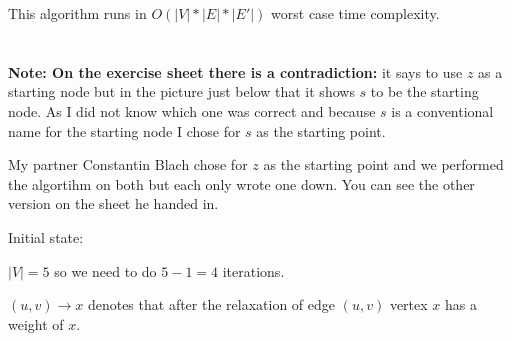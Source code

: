 \documentclass[12pt]{article}
\begin{document}
This algorithm runs in $O(|V| * |E| * |E'|)$ worst case time complexity.

\section{} %
\textbf{Note: On the exercise sheet there is a contradiction:} it says to use $z$ as a starting node but in the picture just below that it shows $s$ to be the starting node. As I did not know which one was correct and because $s$ is a conventional name for the starting node I chose for $s$ as the starting point.

My partner Constantin Blach chose for $z$ as the starting point and we performed the algortihm on both but each only wrote one down. You can see the other version on the sheet he handed in.

Initial state:


$|V| = 5$ so we need to do $5 - 1 = 4$ iterations.

$(u, v) \rightarrow x$ denotes that after the relaxation of edge $(u, v)$ vertex $x$ has a weight of $x$.
\end{document}
